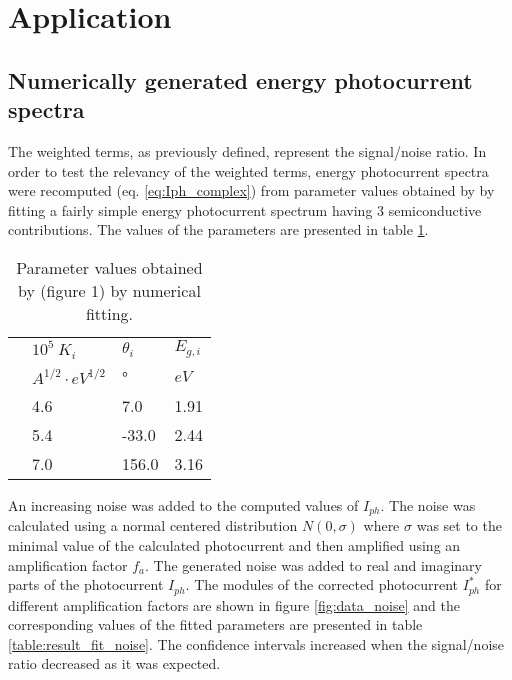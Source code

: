 \section{Application}
\subsection{Numerically generated energy photocurrent spectra}

The weighted terms, as previously defined, represent the signal/noise ratio. 
In order to test the relevancy of the weighted terms, energy photocurrent spectra 
were recomputed (eq. \ref{eq:Iph_complex}) from parameter values obtained 
by \citet{petit2013} by fitting a fairly simple energy photocurrent spectrum 
having 3 semiconductive contributions. The values of the parameters are presented 
in table \ref{table:3m_params}.

\begin{table}[htb]
\centering
\begin{tabular}{ p{1cm}|p{2cm}|p{2cm}| p{2cm}}
\toprule
 & $10^5 \ K_i$ & $\theta _i$ &  $E_{g,i}$\\
 & $A^{1/2} \cdot eV^{1/2}$ & ° & $eV$\\
\midrule
& 4.6    & 7.0 &   1.91\\
&   5.4  & -33.0 & 2.44\\
& 7.0 & 156.0 &  3.16\\
 \bottomrule
\end{tabular}
\caption{Parameter values obtained by \citet{petit2013} (figure 1) by numerical fitting.}
\label{table:3m_params}
\end{table}
 
 An increasing noise was added to the computed values of $I_{ph}$. 
 The noise was calculated using a normal centered distribution $N(0,\sigma)$ 
 where $\sigma$ was set to the minimal value of the calculated photocurrent 
 and then amplified using an amplification factor $f_a$. The generated noise 
 was added to real and imaginary parts of the photocurrent $I_{ph}$. 
 The modules of the corrected photocurrent $I_{ph}^*$ for different amplification 
 factors are shown in figure \ref{fig:data_noise} and the corresponding values 
 of the fitted parameters are presented in table \ref{table:result_fit_noise}. 
 The confidence intervals increased when the signal/noise ratio decreased as it was expected.

